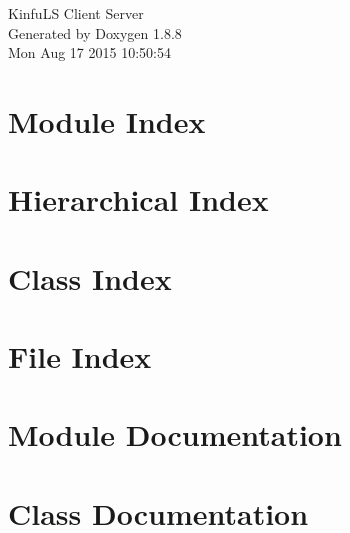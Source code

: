 \documentclass[twoside]{book}
\newcommand{\+}{\discretionary{\mbox{\scriptsize$\hookleftarrow$}}{}{}}
\newcommand{\clearemptydoublepage}{%
  \newpage{\pagestyle{empty}\cleardoublepage}%
}
\begin{document}
\hypersetup{pageanchor=false,
             bookmarks=true,
             bookmarksnumbered=true,
             pdfencoding=unicode
            }
\begin{titlepage}
\vspace*{7cm}
\begin{center}%
{\Large Kinfu\+L\+S Client Server }\\
\vspace*{1cm}
{\large Generated by Doxygen 1.8.8}\\
\vspace*{0.5cm}
{\small Mon Aug 17 2015 10:50:54}\\
\end{center}
\end{titlepage}
\clearemptydoublepage
\tableofcontents
\clearemptydoublepage
{}
\hypersetup{pageanchor=true}

\chapter{Module Index}

\chapter{Hierarchical Index}

\chapter{Class Index}

\chapter{File Index}

\chapter{Module Documentation}


\chapter{Class Documentation}





















\end{document}
